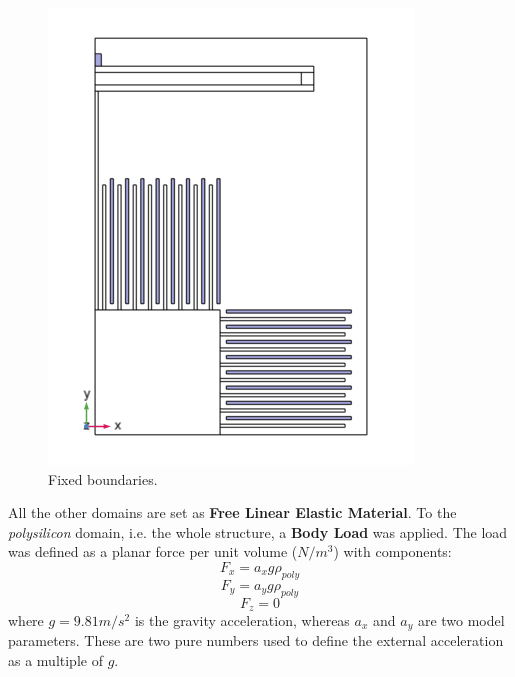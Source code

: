 \documentclass[lettersize,journal]{IEEEtran}
\begin{document}
        \begin{figure}[!h]
            \centering
            \includegraphics[width=1.0\linewidth]{fixed_boundaries.png}
            \caption{Fixed boundaries.}
            \label{fig:fixed-bound}
        \end{figure}
        
        All the other domains are set as \textbf{Free Linear Elastic Material}. To the \textit{polysilicon} domain, i.e. the whole structure, a \textbf{Body Load} was applied. The load was defined as a planar force per unit volume (\(N/m^3\)) with components:
        \begin{equation*}
            F_x=a_x g \rho_{poly}
        \end{equation*}
        \begin{equation*}
            F_y=a_y g \rho_{poly}
        \end{equation*}
        \begin{equation*}
            F_z=0
        \end{equation*}
        where \(g=9.81m/s^2\) is the gravity acceleration, whereas \(a_x\) and \(a_y\) are two model parameters. These are two pure numbers used to define the external acceleration as a multiple of \(g\).
        
\end{document}
